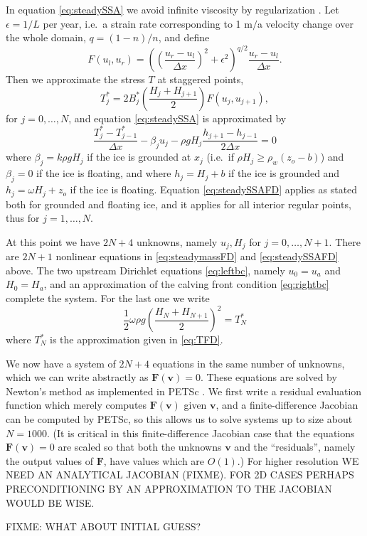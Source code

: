 \documentclass[twocolumn,letterpaper]{igs}
\newcommand{\eps}{\epsilon}
\begin{document}
In equation \eqref{eq:steadySSA} we avoid infinite viscosity by regularization \citep{SchoofStream}.  Let $\eps=1/L$ per year, i.e.~a strain rate corresponding to 1 m$/$a velocity change over the whole domain, $q = (1-n)/n$, and define
\begin{equation}
F(u_l,u_r) = \left(\left(\frac{u_r-u_l}{\Delta x}\right)^2 + \eps^2\right)^{q/2} \frac{u_r-u_l}{\Delta x}. \label{eq:viscregFD}
\end{equation}
Then we approximate the stress $T$ at staggered points,
\begin{equation}
T_j^* = 2 B_j^* \left(\frac{H_j + H_{j+1}}{2}\right) F(u_j,u_{j+1}), \label{eq:TFD}
\end{equation}
for $j=0,\dots,N$, and equation \eqref{eq:steadySSA} is approximated by
\begin{equation}
\frac{T_j^* - T_{j-1}^*}{\Delta x} - \beta_j u_j - \rho g H_j \frac{h_{j+1} - h_{j-1}}{2 \Delta x} = 0 \label{eq:steadySSAFD}
\end{equation}
where $\beta_j = k \rho g H_j$ if the ice is grounded at $x_j$ (i.e.~if $\rho H_j \ge \rho_w (z_o - b)$) and $\beta_j=0$ if the ice is floating, and where $h_j = H_j + b$ if the ice is grounded and $h_j = \omega H_j + z_o$ if the ice is floating.  Equation \eqref{eq:steadySSAFD} applies as stated both for grounded and floating ice, and it applies for all interior regular points, thus for $j=1,\dots,N$.

At this point we have $2N+4$ unknowns, namely $u_j,H_j$ for $j=0,\dots,N+1$.  There are $2N+1$ nonlinear equations in \eqref{eq:steadymassFD} and \eqref{eq:steadySSAFD} above.  The two upstream Dirichlet equations \eqref{eq:leftbc}, namely $u_0=u_a$ and $H_0=H_a$, and an approximation of the calving front condition \eqref{eq:rightbc} complete the system.  For the last one we write
\begin{equation}
\frac{1}{2} \omega \rho g \left(\frac{H_N + H_{N+1}}{2}\right)^2 = T_N^* \label{eq:rightbcFD}
\end{equation}
where $T_N^*$ is the approximation given in \eqref{eq:TFD}.

We now have a system of $2N+4$ equations in the same number of unknowns, which we can write abstractly as $\mathbf{F}(\mathbf{v})=0$.  These equations are solved by Newton's method \citep{Kelley} as implemented in PETSc \citep{petsc-user-ref}.  We first write a residual evaluation function which merely computes $\mathbf{F}(\mathbf{v})$ given $\mathbf{v}$, and a finite-difference Jacobian can be computed by PETSc, so this allows us to solve systems up to size about $N=1000$.  (It is critical in this finite-difference Jacobian case that the equations $\mathbf{F}(\mathbf{v})=0$ are scaled so that both the unknowns $\mathbf{v}$ and the ``residuals'', namely the output values of $\mathbf{F}$, have values which are $O(1)$.)  For higher resolution WE NEED AN ANALYTICAL JACOBIAN (FIXME).  FOR 2D CASES PERHAPS PRECONDITIONING BY AN APPROXIMATION TO THE JACOBIAN WOULD BE WISE.  

FIXME: WHAT ABOUT INITIAL GUESS?
\end{document}
